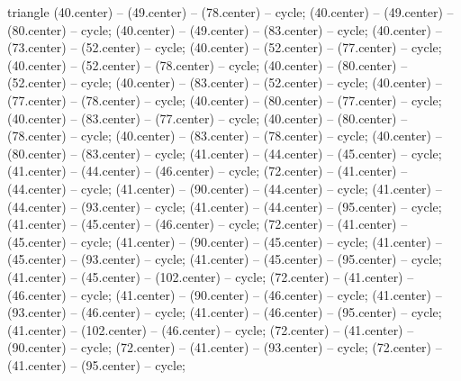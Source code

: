 \begin{pgfonlayer}{triangle}
 (40.center) -- (49.center) -- (78.center) -- cycle; 
 (40.center) -- (49.center) -- (80.center) -- cycle; 
 (40.center) -- (49.center) -- (83.center) -- cycle; 
 (40.center) -- (73.center) -- (52.center) -- cycle; 
 (40.center) -- (52.center) -- (77.center) -- cycle; 
 (40.center) -- (52.center) -- (78.center) -- cycle; 
 (40.center) -- (80.center) -- (52.center) -- cycle; 
 (40.center) -- (83.center) -- (52.center) -- cycle; 
 (40.center) -- (77.center) -- (78.center) -- cycle; 
 (40.center) -- (80.center) -- (77.center) -- cycle; 
 (40.center) -- (83.center) -- (77.center) -- cycle; 
 (40.center) -- (80.center) -- (78.center) -- cycle; 
 (40.center) -- (83.center) -- (78.center) -- cycle; 
 (40.center) -- (80.center) -- (83.center) -- cycle; 
 (41.center) -- (44.center) -- (45.center) -- cycle; 
 (41.center) -- (44.center) -- (46.center) -- cycle; 
 (72.center) -- (41.center) -- (44.center) -- cycle; 
 (41.center) -- (90.center) -- (44.center) -- cycle; 
 (41.center) -- (44.center) -- (93.center) -- cycle; 
 (41.center) -- (44.center) -- (95.center) -- cycle; 
 (41.center) -- (45.center) -- (46.center) -- cycle; 
 (72.center) -- (41.center) -- (45.center) -- cycle; 
 (41.center) -- (90.center) -- (45.center) -- cycle; 
 (41.center) -- (45.center) -- (93.center) -- cycle; 
 (41.center) -- (45.center) -- (95.center) -- cycle; 
 (41.center) -- (45.center) -- (102.center) -- cycle; 
 (72.center) -- (41.center) -- (46.center) -- cycle; 
 (41.center) -- (90.center) -- (46.center) -- cycle; 
 (41.center) -- (93.center) -- (46.center) -- cycle; 
 (41.center) -- (46.center) -- (95.center) -- cycle; 
 (41.center) -- (102.center) -- (46.center) -- cycle; 
 (72.center) -- (41.center) -- (90.center) -- cycle; 
 (72.center) -- (41.center) -- (93.center) -- cycle; 
 (72.center) -- (41.center) -- (95.center) -- cycle; 

\end{pgfonlayer}
